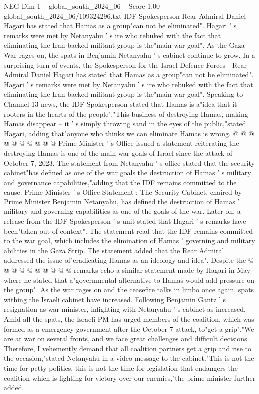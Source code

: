 \begin{textsample}{NEG Dim 1 – global\_south\_2024\_06 – Score 1.00 – global\_south\_2024\_06/109324296.txt}  \label{ex:f1_neg_402}
IDF Spokesperson Rear Admiral Daniel Hagari has stated that Hamas as a group"can not be eliminated".
Hagari ' s remarks were met by Netanyahu ' s ire who rebuked with the fact that eliminating the Iran-backed militant group is the"main war goal".
As the Gaza War rages on, the spats in Benjamin Netanyahu ' s cabinet continue to grow.
In a surprising turn of events, the Spokesperson for the Israel Defence Forces - Rear Admiral Daniel Hagari has stated that Hamas as a group"can not be eliminated".
Hagari ' s remarks were met by Netanyahu ' s ire who rebuked with the fact that eliminating the Iran-backed militant group is the"main war goal".
Speaking to Channel 13 news, the IDF Spokesperson stated that Hamas is a"idea that it rooters in the hearts of the people"."This business of destroying Hamas, making Hamas disappear -- it ' s simply throwing sand in the eyes of the public,"stated Hagari, adding that"anyone who thinks we can eliminate Hamas is wrong. @ @ @ @ @ @ @ @ @ @ Prime Minister ' s Office issued a statement reiterating the destroying Hamas is one of the main war goals of Israel since the attack of October 7, 2023.
The statement from Netanyahu ' s office stated that the security cabinet"has defined as one of the war goals the destruction of Hamas ' s military and governance capabilities,"adding that the IDF remains committed to the cause.
Prime Minister ' s Office Statement : The Security Cabinet, chaired by Prime Minister Benjamin Netanyahu, has defined the destruction of Hamas ' military and governing capabilities as one of the goals of the war.
Later on, a release from the IDF Spokesperson ' s unit stated that Hagari ' s remarks have been"taken out of context".
The statement read that the IDF remains committed to the war goal, which includes the elimination of Hamas ' governing and military abilities in the Gaza Strip.
The statement added that the Rear Admiral addressed the issue of"eradicating Hamas as an ideology and idea".
Despite the @ @ @ @ @ @ @ @ @ @ remarks echo a similar statement made by Hagari in May where he stated that a"governmental alternative to Hamas would add pressure on the group".
As the war rages on and the ceasefire talks in limbo once again, spats withing the Israeli cabinet have increased.
Following Benjamin Gantz ' s resignation as war minister, infighting with Netanyahu ' s cabinet as increased.
Amid all the spats, the Israeli PM has urged members of the coalition, which was formed as a emergency government after the October 7 attack, to"get a grip"."We are at war on several fronts, and we face great challenges and difficult decisions.
Therefore, I vehemently demand that all coalition partners get a grip and rise to the occasion,"stated Netanyahu in a video message to the cabinet."This is not the time for petty politics, this is not the time for legislation that endangers the coalition which is fighting for victory over our enemies,"the prime minister further added.

\end{textsample}
